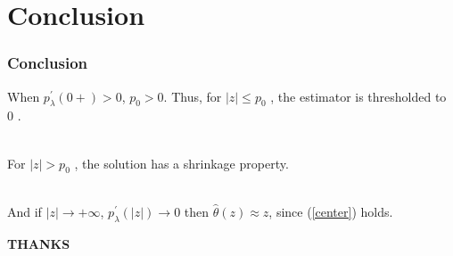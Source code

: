 \documentclass{beamer}
\begin{document}
\section{Conclusion}
\begin{frame}
  \frametitle{Conclusion}
  When  $p_{\lambda}^{\prime}(0+)>0$, $p_{0}>0 $. Thus, for $ |z| \leq p_{0}$ , 
  the estimator is thresholded to $0$ . 

  ~\\
  For  $|z|>p_{0}$ , the solution has a shrinkage property. 

  ~\\
  And if $|z| \rightarrow+\infty $, $p_{\lambda}^{\prime}(|z|) \rightarrow 0 $ then $\hat \theta(z) \approx z$, since (\ref{center}) holds. 
\end{frame}
\begin{frame}
\centering
\Huge{\textbf{ THANKS} }
\end{frame}
\end{document}
